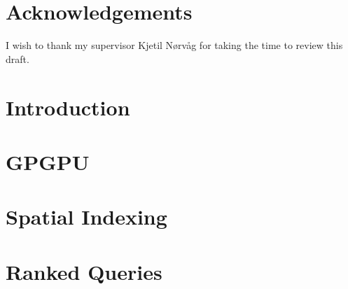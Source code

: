 \documentclass[12pt]{report}
\begin{document}
\chapter*{Acknowledgements}
I wish to thank my supervisor Kjetil Nørvåg for taking the time to review this draft.

\tableofcontents

\chapter{Introduction}


\chapter{GPGPU}


\chapter{Spatial Indexing}


\chapter{Ranked Queries}


%

%

\printbibliography{}
\end{document}
